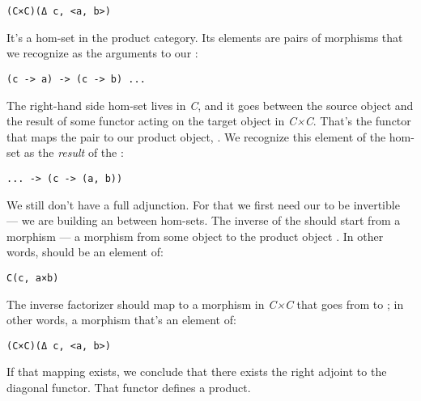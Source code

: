 \begin{Verbatim}[commandchars=\\\{\}]
(C×C)(Δ c, <a, b>)
\end{Verbatim}
It's a hom-set in the product category. Its elements are pairs of
morphisms that we recognize as the arguments to our :

\begin{Verbatim}[commandchars=\\\{\}]
(c -> a) -> (c -> b) ...
\end{Verbatim}
The right-hand side hom-set lives in \emph{C}, and it goes between the
source object  and the result of some functor 
acting on the target object in \emph{C×C}. That's the functor that maps
the pair  to our product object,
. We recognize this element of the hom-set as the
\emph{result} of the :

\begin{Verbatim}[commandchars=\\\{\}]
... -> (c -> (a, b))
\end{Verbatim}

\begin{figure}[H]
\centering
{}
\end{figure}

\noindent
We still don't have a full adjunction. For that we first need our
 to be invertible --- we are building an
 between hom-sets. The inverse of the
 should start from a morphism  --- a
morphism from some object  to the product object .
In other words,  should be an element of:

\begin{Verbatim}[commandchars=\\\{\}]
C(c, a×b)
\end{Verbatim}
The inverse factorizer should map  to a morphism
 in \emph{C×C} that goes from
 to
; in other words, a morphism
that's an element of:

\begin{Verbatim}[commandchars=\\\{\}]
(C×C)(Δ c, <a, b>)
\end{Verbatim}
If that mapping exists, we conclude that there exists the right adjoint
to the diagonal functor. That functor defines a product.

